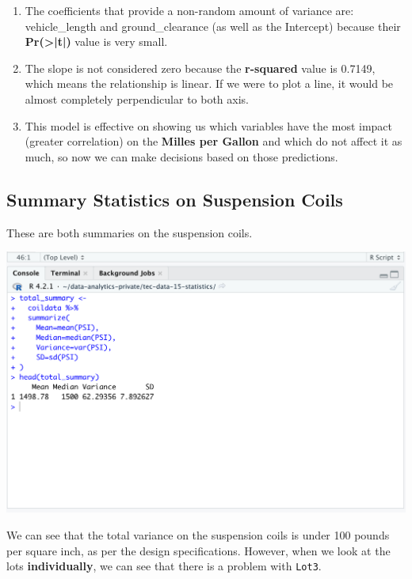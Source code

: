 \documentclass[11pt]{article}
\begin{document}
\begin{enumerate}
\item The coefficients that provide a non-random amount of variance are: vehicle\_length and ground\_clearance (as well as the Intercept) because their \textbf{Pr(>|t|)} value is very small.
\item The slope is not considered zero because the \textbf{r-squared} value is 0.7149, which means the relationship is linear. If we were to plot a line, it would be almost completely perpendicular to both axis.
\item This model is effective on showing us which variables have the most impact (greater correlation) on the \textbf{Milles per Gallon} and which do not affect it as much, so now we can make decisions based on those predictions.
\end{enumerate}


\subsection{Summary Statistics on Suspension Coils}
\label{sec:org4a82521}

These are both summaries on the suspension coils.

\begin{center}
\includegraphics[width=.9\linewidth]{./resources/_r_2.png}
\end{center}

We can see that the total variance on the suspension coils is under 100 pounds per square inch, as per the design specifications. However, when we look at the lots \textbf{individually}, we can see that there is a problem with \texttt{Lot3}.
\end{document}
